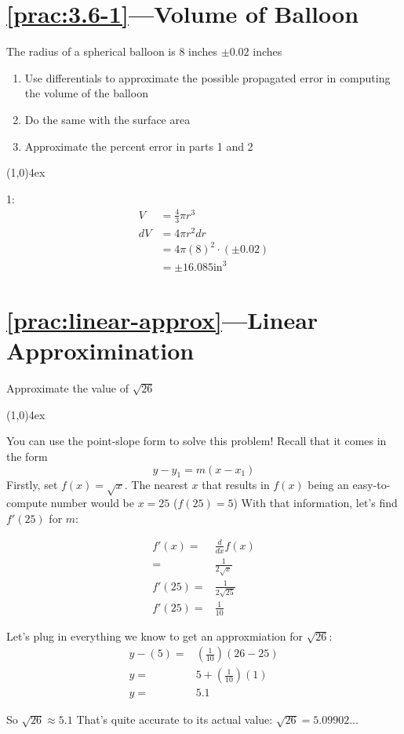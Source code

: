 \documentclass{MathNotes}
\newcommand{\br}{
	\begin{center}
		\line(1,0){4ex}
	\end{center}}
\begin{document}
\section*{\ref{prac:3.6-1}---Volume of Balloon}\label{ans:3.6-1}
The radius of a spherical balloon is 8 inches $\pm 0.02$ inches
\begin{enumerate}
	\item Use differentials to approximate the possible propagated error in computing the volume of the balloon
	\item Do the same with the surface area
	\item Approximate the percent error in parts 1 and 2
\end{enumerate}
\br
1:
\begin{align*}
	V  & =\frac{4}{3}\pi r^3       \\
	dV & =4\pi r^2 dr              \\
	   & =4\pi(8)^2\cdot(\pm 0.02) \\
	   & =\pm 16.085 \text{in}^3
\end{align*}

\section*{\ref{prac:linear-approx}---Linear Approximination}\label{ans:linear-approx}
Approximate the value of $\sqrt{26}$
\br
You can use the point-slope form to solve this problem! Recall that it comes in
the form \[y-y_1=m(x-x_1)\] Firstly, set $f(x)=\sqrt{x}$. The nearest $x$ that
results in $f(x)$ being an easy-to-compute number would be $x=25$ ($f(25)=5$)
With that information, let's find $f'(25)$ for $m$:

\begin{align*}
	f'(x) =  & \frac{d}{dx}f(x)     \\
	=        & \frac{1}{2\sqrt{x}}  \\
	f'(25) = & \frac{1}{2\sqrt{25}} \\
	f'(25) = & \frac{1}{10}
\end{align*}

Let's plug in everything we know to get an approxmiation for $\sqrt{26}$:
\begin{align*}
	y-(5) = & (\frac{1}{10})(26-25) \\
	y =     & 5 + (\frac{1}{10})(1) \\
	y =     & 5.1
\end{align*}

So $\sqrt{26}\approx 5.1$\newline
That's quite accurate to its actual value: $\sqrt{26}=5.09902\ldots$
\end{document}

